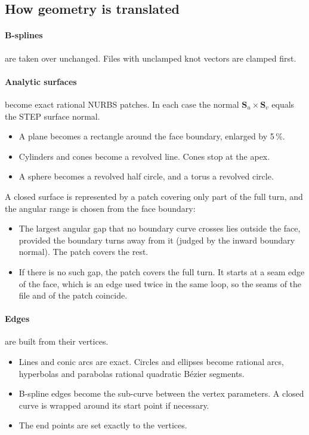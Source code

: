 \subsection{How geometry is translated}

\paragraph{B-splines} are taken over unchanged. Files with unclamped knot vectors are clamped
first.

\paragraph{Analytic surfaces} become exact rational NURBS patches. In each case the normal
$\mathbf S_u\times\mathbf S_v$ equals the STEP surface normal.
\begin{itemize}
  \item A plane becomes a rectangle around the face boundary, enlarged by 5\,\%.
  \item Cylinders and cones become a revolved line. Cones stop at the apex.
  \item A sphere becomes a revolved half circle, and a torus a revolved circle.
\end{itemize}
A closed surface is represented by a patch covering only part of the full turn, and the
angular range is chosen from the face boundary:
\begin{itemize}
  \item The largest angular gap that no boundary curve crosses lies outside the face,
    provided the boundary turns away from it (judged by the inward boundary normal). The
    patch covers the rest.
  \item If there is no such gap, the patch covers the full turn. It starts at a seam edge of
    the face, which is an edge used twice in the same loop, so the seams of the file and of
    the patch coincide.
\end{itemize}

\paragraph{Edges} are built from their vertices.
\begin{itemize}
  \item Lines and conic arcs are exact. Circles and ellipses become rational arcs, hyperbolas
    and parabolas rational quadratic B\'ezier segments.
  \item B-spline edges become the sub-curve between the vertex parameters. A closed curve is
    wrapped around its start point if necessary.
  \item The end points are set exactly to the vertices.
\end{itemize}

